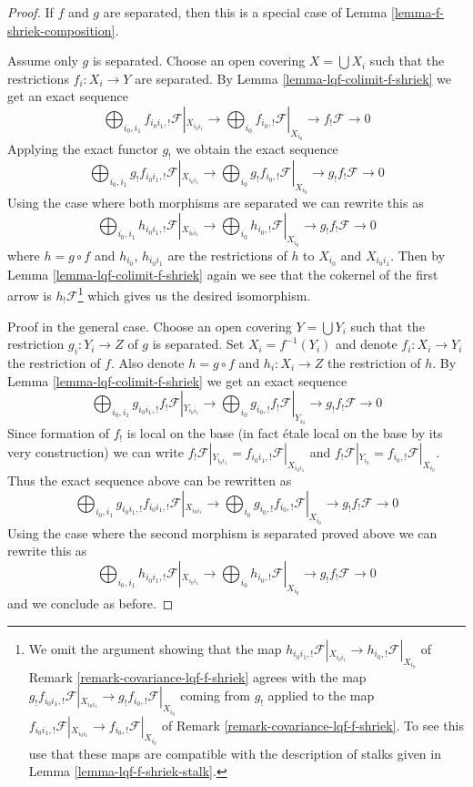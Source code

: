 \begin{proof}
If $f$ and $g$ are separated, then this is a special case of
Lemma \ref{lemma-f-shriek-composition}.

\medskip\noindent
Assume only $g$ is separated. Choose an open covering
$X = \bigcup X_i$ such that the restrictions $f_i : X_i \to Y$
are separated. By Lemma \ref{lemma-lqf-colimit-f-shriek}
we get an exact sequence
$$
\bigoplus\nolimits_{i_0, i_1} f_{i_0i_1, !} \mathcal{F}|_{X_{i_0i_1}} \to
\bigoplus\nolimits_{i_0} f_{i_0, !} \mathcal{F}|_{X_{i_0}}
\to f_!\mathcal{F} \to 0
$$
Applying the exact functor $g_!$ we obtain the exact sequence
$$
\bigoplus\nolimits_{i_0, i_1} g_!f_{i_0i_1, !} \mathcal{F}|_{X_{i_0i_1}} \to
\bigoplus\nolimits_{i_0} g_!f_{i_0, !} \mathcal{F}|_{X_{i_0}}
\to g_!f_!\mathcal{F} \to 0
$$
Using the case where both morphisms are separated we can rewrite this as
$$
\bigoplus\nolimits_{i_0, i_1} h_{i_0i_1, !} \mathcal{F}|_{X_{i_0i_1}} \to
\bigoplus\nolimits_{i_0} h_{i_0, !} \mathcal{F}|_{X_{i_0}}
\to g_!f_!\mathcal{F} \to 0
$$
where $h = g \circ f$ and $h_{i_0}$, $h_{i_0i_1}$ are the restrictions
of $h$ to $X_{i_0}$ and $X_{i_0i_1}$. Then by
Lemma \ref{lemma-lqf-colimit-f-shriek}
again we see that the cokernel of the first arrow is
$h_!\mathcal{F}$\footnote{We omit the argument showing that the map
$h_{i_0i_1, !} \mathcal{F}|_{X_{i_0i_1}} \to h_{i_0, !} \mathcal{F}|_{X_{i_0}}$
of Remark \ref{remark-covariance-lqf-f-shriek} agrees with the map
$g_!f_{i_0i_1, !} \mathcal{F}|_{X_{i_0i_1}} \to
g_!f_{i_0, !} \mathcal{F}|_{X_{i_0}}$
coming from $g_!$ applied to the map
$f_{i_0i_1, !} \mathcal{F}|_{X_{i_0i_1}} \to f_{i_0, !} \mathcal{F}|_{X_{i_0}}$
of Remark \ref{remark-covariance-lqf-f-shriek}. To see this use
that these maps are compatible with the description of stalks given
in Lemma \ref{lemma-lqf-f-shriek-stalk}.} which gives us the desired
isomorphism.

\medskip\noindent
Proof in the general case. Choose an open covering $Y = \bigcup Y_i$ such that
the restriction $g_i : Y_i \to Z$ of $g$ is separated. Set $X_i = f^{-1}(Y_i)$
and denote $f_i : X_i \to Y_i$ the restriction of $f$. Also denote
$h = g \circ f$ and $h_i : X_i \to Z$ the restriction of $h$.
By Lemma \ref{lemma-lqf-colimit-f-shriek}
we get an exact sequence
$$
\bigoplus\nolimits_{i_0, i_1} g_{i_0i_1, !} f_!\mathcal{F}|_{Y_{i_0i_1}} \to
\bigoplus\nolimits_{i_0} g_{i_0, !} f_!\mathcal{F}|_{Y_{i_0}}
\to g_!f_!\mathcal{F} \to 0
$$
Since formation of $f_!$ is local on the base (in fact \'etale local on
the base by its very construction) we can write
$f_!\mathcal{F}|_{Y_{i_0i_1}} = f_{i_0i_1, !}\mathcal{F}|_{X_{i_0i_1}}$
and
$f_!\mathcal{F}|_{Y_{i_0}} = f_{i_0, !}\mathcal{F}|_{X_{i_0}}$.
Thus the exact sequence above can be rewritten as
$$
\bigoplus\nolimits_{i_0, i_1} g_{i_0i_1, !}
f_{i_0i_1, !}\mathcal{F}|_{X_{i_0i_1}} \to
\bigoplus\nolimits_{i_0} g_{i_0, !} f_{i_0, !}\mathcal{F}|_{X_{i_0}}
\to g_!f_!\mathcal{F} \to 0
$$
Using the case where the second morphism is separated proved above
we can rewrite this as
$$
\bigoplus\nolimits_{i_0, i_1} h_{i_0i_1, !}\mathcal{F}|_{X_{i_0i_1}} \to
\bigoplus\nolimits_{i_0} h_{i_0, !}\mathcal{F}|_{X_{i_0}}
\to g_!f_!\mathcal{F} \to 0
$$
and we conclude as before.


\end{proof}
